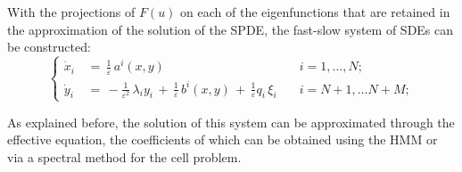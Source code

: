With the projections of $F(u)$ on each of the eigenfunctions that are retained
in the approximation of the solution of the SPDE, the fast-slow system of SDEs
can be constructed:
\begin{equation}
    \left\{\begin{aligned} 
            \dot x_{i}\,&=\,\frac 1 {\varepsilon}\,a^{i}(x,y)
            & \quad i = 1,{\dots}, N;  \\ \dot y_{i}\,&=\,-\frac 1 {{\varepsilon}^{2}}\, {\lambda}_{i}
            y_{i}\,+\,\frac 1{\varepsilon}\,b^{i}(x,y)\,+\,\frac 1{{\varepsilon}}q_{i}\,{\xi}_{i} &
            \quad i = N+1, {\dots}N+M;
        \end{aligned} \right. 
    \label{eq: fast-slow system SPDE}
\end{equation}

As explained before, the solution of this system can be approximated through the
effective equation, the coefficients of which can be obtained using the HMM or via a spectral
method for the cell problem.  

